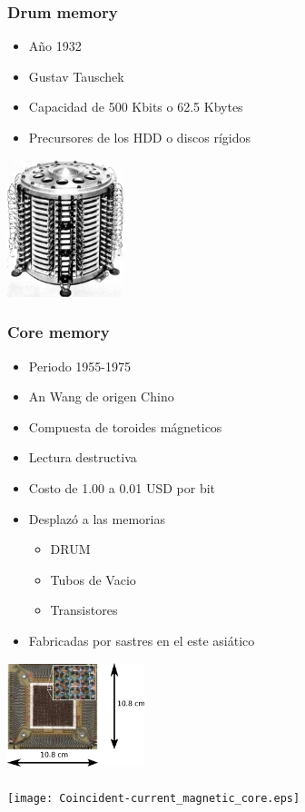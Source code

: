 \documentclass{beamer}
\begin{document}
\begin{frame}
\frametitle{Drum memory}
\begin{minipage}[b]{7.5cm}
	\begin{itemize}
		\item Año 1932
		\item Gustav Tauschek
		\item Capacidad de 500 Kbits o 62.5 Kbytes
		\item Precursores de los HDD o discos rígidos
	\end{itemize}
\end{minipage}
\begin{minipage}[c]{4cm}
	\begin{center}
		\includegraphics[height=4cm]{Pamiec_bebnowa_1.jpg}
	\end{center}
\end{minipage}
\end{frame}

\begin{frame}
\frametitle{Core memory}
\begin{minipage}[c]{7.5cm}
	\begin{itemize}
		\item Periodo 1955-1975
		\item An Wang de origen Chino
		\item Compuesta de toroides mágneticos
		\item Lectura destructiva
		\item Costo de 1.00 a 0.01 USD por bit
		\item Desplazó a las memorias
			\begin{itemize}
				\item DRUM
				\item Tubos de Vacio
				\item Transistores
			\end{itemize}
		\item Fabricadas por sastres en el este asiático
	\end{itemize}
\end{minipage}
\begin{minipage}[c]{4cm}
	\includegraphics[width=4cm]{Ferrite_core_memory.eps} \\ \\
	\texttt{[image: Coincident-current\_magnetic\_core.eps]}
\end{minipage}
\end{frame}
\end{document}
